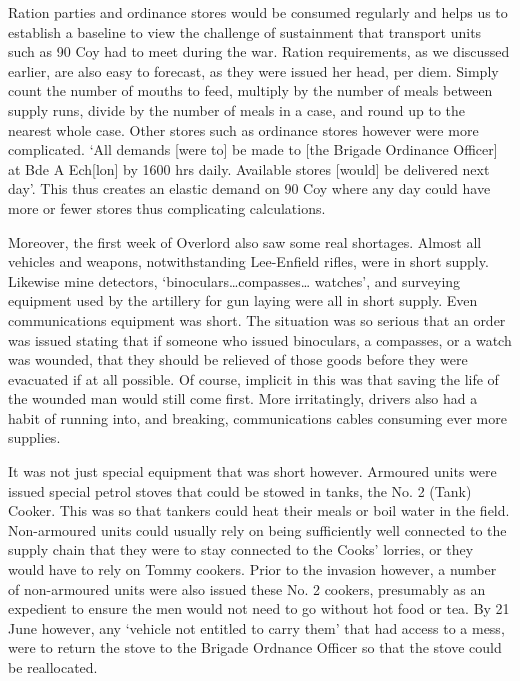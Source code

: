 \documentclass[noraggedright]{turabian-researchpaper}
\newcommand{\RASCOrg}{202 O.C.T.U., R.A.S.C. Training School. 
Organisation of the R.A.S.C.}
\begin{document}
Ration parties and ordinance stores would be consumed regularly and
helps us to establish a baseline to view the challenge of sustainment that 
transport units such as 90 Coy had to meet during the war.\autocite[\RASCOrg]
[3, 16 a--c]{pope-pp}
Ration requirements, as we discussed earlier, are also easy to forecast, as 
they were issued her head, per diem.  Simply count the number of mouths to 
feed, multiply by the number of meals between supply runs, divide by the 
number of meals in a case, and round up to the nearest whole case.  Other
stores such as ordinance stores however were more complicated.  `All demands 
[were to] be made to [the Brigade Ordinance Officer] at Bde A Ech[lon] by 
1600 hrs daily.  Available stores [would] be delivered next day'.\autocite
[June Admin Order No. 1][Para 6a]{27wd}  This thus creates an elastic demand 
on 90 Coy where any day could have more or fewer stores thus complicating 
calculations.  

Moreover, the first week of Overlord also saw some real shortages.  
Almost all vehicles and weapons, notwithstanding Lee-Enfield rifles, were in 
short supply.  Likewise mine detectors, `binoculars\ldots  compasses\ldots  
watches', and surveying equipment used by the artillery for gun laying 
were all in short supply.  Even communications equipment was short.\autocite
[Appendix A to 27 Armd Bde Adm Order No. 1 (June)]{27wd} 
The situation was so serious that an order was issued stating that if someone 
who issued binoculars, a compasses, or a watch was wounded, that they should 
be relieved of those goods before they were evacuated if at all 
possible.\autocite[June Adm Order No. 3][4a]{27wd}  Of course, implicit in 
this was that saving the life of the wounded man would still come first.
More irritatingly, drivers also had a habit of running into, and breaking, 
communications cables consuming ever more supplies.\autocite[June Adm Order 
No. 2][Para 3]{27wd}  

It was not just special equipment that was short however.  Armoured 
units were issued special petrol stoves that could be stowed in tanks, the 
No. 2 (Tank) Cooker.  This was so that tankers
could heat their meals or boil water in the field. Non-armoured units could 
usually rely on being sufficiently well connected to the supply chain that 
they were to stay connected to the Cooks' lorries, or they would have to rely 
on Tommy cookers. 
Prior to the invasion however, a number of non-armoured 
units were also issued these No. 2 cookers, presumably as an expedient to 
ensure the men would not need to go without hot food or tea.  By 21 June 
however, any `vehicle not entitled to carry them' that had access to a mess, 
were to return the stove to the Brigade Ordnance Officer so that the stove 
could be reallocated.\autocite[June Adm Order No. 3][Para 3a]{27wd}
\end{document}

